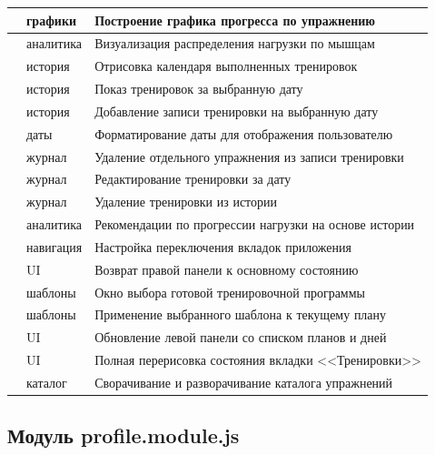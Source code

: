\begin{xltabular}{\textwidth}{|P{4.4cm}|P{3.4cm}|X|}
	 & графики & Построение графика прогресса по упражнению \\ \hline
	 & аналитика & Визуализация распределения нагрузки по мышцам \\ \hline
	 & история & Отрисовка календаря выполненных тренировок \\ \hline
	 & история & Показ тренировок за выбранную дату \\ \hline
	 & история & Добавление записи тренировки на выбранную дату \\ \hline
	 & даты & Форматирование даты для отображения пользователю \\ \hline
	 & журнал & Удаление отдельного упражнения из записи тренировки \\ \hline
	 & журнал & Редактирование тренировки за дату \\ \hline
	 & журнал & Удаление тренировки из истории \\ \hline
	 & аналитика & Рекомендации по прогрессии нагрузки на основе истории \\ \hline
	 & навигация & Настройка переключения вкладок приложения \\ \hline
	 & UI & Возврат правой панели к основному состоянию \\ \hline
	 & шаблоны & Окно выбора готовой тренировочной программы \\ \hline
	 & шаблоны & Применение выбранного шаблона к текущему плану \\ \hline
	 & UI & Обновление левой панели со списком планов и дней \\ \hline
	 & UI & Полная перерисовка состояния вкладки <<Тренировки>> \\ \hline
	 & каталог & Сворачивание и разворачивание каталога упражнений \\ \hline
\end{xltabular}

\subsection{Модуль profile.module.js}

